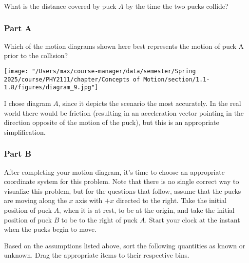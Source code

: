 What is the distance covered by puck $A$ by the time the two pucks collide?

\subsubsection{Part A}

Which of the motion diagrams shown here best represents the motion of puck A prior to the collision?

\begin{center}
	\texttt{[image: "/Users/max/course-manager/data/semester/Spring 2025/course/PHY2111/chapter/Concepts of Motion/section/1.1-1.8/figures/diagram\_9.jpg"]}
\end{center}

\begin{solution}
	I chose diagram $A$, since it depicts the scenario the most accurately. In the real world there would be friction (resulting in an acceleration vector pointing in the direction opposite of the motion of the puck), but this is an appropriate simplification.
\end{solution}

\subsubsection{Part B}

After completing your motion diagram, it's time to choose an appropriate coordinate system for this problem. Note that there is no single correct way to visualize this problem, but for the questions that follow, assume that the pucks are moving along the $x$ axis with $+x$ directed to the right. Take the initial position of puck $A$, when it is at rest, to be at the origin, and take the initial position of puck $B$ to be to the right of puck $A$. Start your clock at the instant when the pucks begin to move.

Based on the assumptions listed above, sort the following quantities as known or unknown.
Drag the appropriate items to their respective bins.

\vspace{1em}

